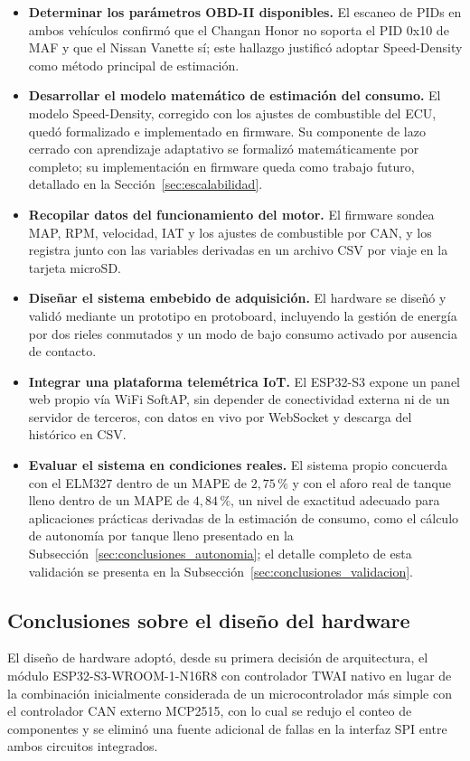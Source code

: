 \begin{itemize}
	\item \textbf{Determinar los parámetros OBD-II disponibles.} El escaneo de PIDs en ambos vehículos confirmó que el Changan Honor no soporta el PID 0x10 de MAF y que el Nissan Vanette sí; este hallazgo justificó adoptar Speed-Density como método principal de estimación.
	\item \textbf{Desarrollar el modelo matemático de estimación del consumo.} El modelo Speed-Density, corregido con los ajustes de combustible del ECU, quedó formalizado e implementado en firmware. Su componente de lazo cerrado con aprendizaje adaptativo se formalizó matemáticamente por completo; su implementación en firmware queda como trabajo futuro, detallado en la Sección~\ref{sec:escalabilidad}.
	\item \textbf{Recopilar datos del funcionamiento del motor.} El firmware sondea MAP, RPM, velocidad, IAT y los ajustes de combustible por CAN, y los registra junto con las variables derivadas en un archivo CSV por viaje en la tarjeta microSD.
	\item \textbf{Diseñar el sistema embebido de adquisición.} El hardware se diseñó y validó mediante un prototipo en protoboard, incluyendo la gestión de energía por dos rieles conmutados y un modo de bajo consumo activado por ausencia de contacto.
	\item \textbf{Integrar una plataforma telemétrica IoT.} El ESP32-S3 expone un panel web propio vía WiFi SoftAP, sin depender de conectividad externa ni de un servidor de terceros, con datos en vivo por WebSocket y descarga del histórico en CSV.
	\item \textbf{Evaluar el sistema en condiciones reales.} El sistema propio concuerda con el ELM327 dentro de un MAPE de $2{,}75\,\%$ y con el aforo real de tanque lleno dentro de un MAPE de $4{,}84\,\%$, un nivel de exactitud adecuado para aplicaciones prácticas derivadas de la estimación de consumo, como el cálculo de autonomía por tanque lleno presentado en la Subsección~\ref{sec:conclusiones_autonomia}; el detalle completo de esta validación se presenta en la Subsección~\ref{sec:conclusiones_validacion}.
\end{itemize}

\subsection{Conclusiones sobre el diseño del hardware}

El diseño de hardware adoptó, desde su primera decisión de arquitectura, el módulo ESP32-S3-WROOM-1-N16R8 con controlador TWAI nativo en lugar de la combinación inicialmente considerada de un microcontrolador más simple con el controlador CAN externo MCP2515, con lo cual se redujo el conteo de componentes y se eliminó una fuente adicional de fallas en la interfaz SPI entre ambos circuitos integrados.

